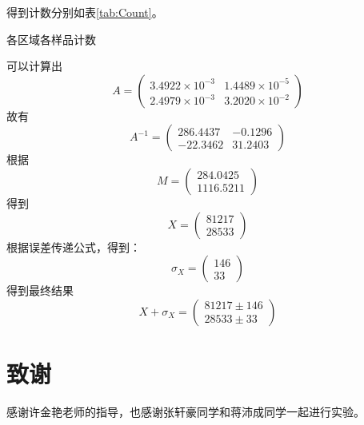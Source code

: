 \documentclass{article}
\begin{document}
    得到计数分别如表\ref{tab:Count}。
    \begin{table}[htbp]
        \centering
        \caption{各区域各样品计数\label{tab:Count}}
        
    \end{table}

    可以计算出
    \begin{equation}
        A = \begin{pmatrix}
            3.4922\times10^{-3}&1.4489\times10^{-5}\\
       2.4979\times10^{-3}&3.2020\times10^{-2}
        \end{pmatrix}
    \end{equation}
    故有
    \begin{equation}
        A^{-1} = \begin{pmatrix}
            286.4437  & -0.1296\\
  -22.3462  & 31.2403
        \end{pmatrix}
    \end{equation}
    根据\begin{equation}
        M = \begin{pmatrix}
            284.0425\\1116.5211
        \end{pmatrix}
    \end{equation}
    得到\begin{equation}
        X = \begin{pmatrix}
            81217\\28533
        \end{pmatrix}
    \end{equation}
    根据误差传递公式，得到：
    \begin{equation}
        \sigma_{X} = \begin{pmatrix}
            146\\
   33
        \end{pmatrix}
    \end{equation}
    得到最终结果
    \begin{equation}
        X+\sigma_{X} = \begin{pmatrix}
            81217 \pm 146\\
            28533\pm33
        \end{pmatrix}
    \end{equation}
\section{致谢}
    感谢许金艳老师的指导，也感谢张轩豪同学和蒋沛成同学一起进行实验。 
    \clearpage
    \appendix
    \appendixpage
\end{document}
